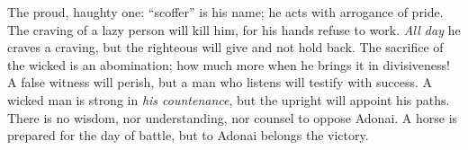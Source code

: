 \begin{biblechapter}
\verse The proud, haughty one: “scoffer” is his name; 
he acts with arrogance of pride.
\verse The craving of a lazy person will kill him, 
for his hands refuse to work.
\verse \textit{All day} he craves a craving, 
but the righteous will give and not hold back.
\verse The sacrifice of the wicked is an abomination; 
how much more when he brings it in divisiveness!
\verse A false witness will perish, 
but a man who listens will testify with success.
\verse A wicked man is strong in \textit{his countenance}, 
but the upright will appoint his paths.
\verse There is no wisdom, nor understanding, 
nor counsel to oppose Adonai.
\verse A horse is prepared for the day of battle, 
but to Adonai belongs the victory.
\end{biblechapter}

